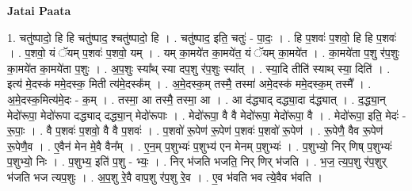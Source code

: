 \documentclass[17pt]{extarticle}
\begin{document}
\textbf{Jatai Paata} \newline

1. चतु॑ष्पादो॒ हि हि चतु॑ष्पाद॒ श्चतु॑ष्पादो॒ हि । . चतु॑ष्पाद॒ इति॒ चतुः॑ - पा॒दः॒ । . हि प॒शवः॑ प॒शवो॒ हि हि प॒शवः॑ । . प॒शवो॒ यं ॅयम् प॒शवः॑ प॒शवो॒ यम् । . यम् का॒मये॑त का॒मये॑त॒ यं ॅयम् का॒मये॑त । . का॒मये॑ता प॒शु र॑प॒शुः का॒मये॑त का॒मये॑ता प॒शुः । . अ॒प॒शुः स्या᳚थ् स्या दप॒शु र॑प॒शुः स्या᳚त् । . स्या॒दि तीति॑ स्याथ् स्या॒ दिति॑ । . इत्य॑ मे॒दस्क॑ ममे॒दस्क॒ मिती त्य॑मे॒दस्क᳚म् । . अ॒मे॒दस्क॒म् तस्मै॒ तस्मा॑ अमे॒दस्क॑ ममे॒दस्क॒म् तस्मै᳚ । . अ॒मे॒दस्क॒मित्य॑मे॒दः - क॒म् । . तस्मा॒ आ तस्मै॒ तस्मा॒ आ । . आ द॑द्ध्याद् दद्ध्या॒दा द॑द्ध्यात् । . द॒द्ध्या॒न् मेदो॑रूपा॒ मेदो॑रूपा दद्ध्याद् दद्ध्या॒न् मेदो॑रूपाः । . मेदो॑रूपा॒ वै वै मेदो॑रूपा॒ मेदो॑रूपा॒ वै । . मेदो॑रूपा॒ इति॒ मेदः॑ - रू॒पाः॒ । . वै प॒शवः॑ प॒शवो॒ वै वै प॒शवः॑ । . प॒शवो॑ रू॒पेण॑ रू॒पेण॑ प॒शवः॑ प॒शवो॑ रू॒पेण॑ । . रू॒पेणै॒ वैव रू॒पेण॑ रू॒पेणै॒व । . ए॒वैन॑ मेन मे॒वै वैन᳚म् । . ए॒न॒म् प॒शुभ्यः॑ प॒शुभ्य॑ एन मेनम् प॒शुभ्यः॑ । . प॒शुभ्यो॒ निर् णिष् प॒शुभ्यः॑ प॒शुभ्यो॒ निः । . प॒शुभ्य॒ इति॑ प॒शु - भ्यः॒ । . निर् भ॑जति भजति॒ निर् णिर् भ॑जति । . भ॒ज॒ त्य॒प॒शु र॑प॒शुर् भ॑जति भज त्यप॒शुः । . अ॒प॒शु रे॒वै वाप॒शु र॑प॒शु रे॒व । . ए॒व भ॑वति भव त्ये॒वैव भ॑वति । \newline
\end{document}
